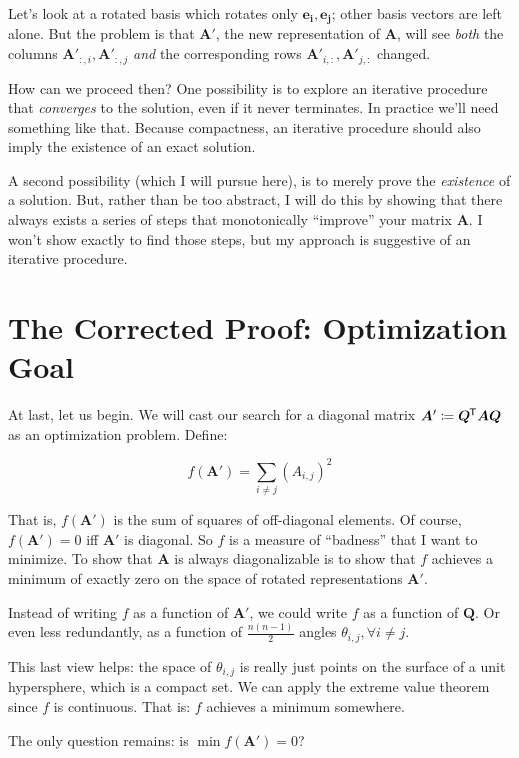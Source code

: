 \documentclass[11pt, oneside]{amsart}
\newcommand{\mtx}[1]{\bm{#1}}
\newcommand*{\tran}{^{\mkern-1.5mu\mathsf{T}}}
\renewcommand{\vec}[1]{\mathbf{#1}}
\newcommand{\bvec}[1]{\vec{e_{#1}}}
\newcommand{\mtxA}{\mtx{A}}
\newcommand{\mtxQ}{\mtx{Q}}
\begin{document}
Let's look at a rotated basis which rotates only $\bvec{i}, \bvec{j}$;
other basis vectors are left alone. But the problem is that $\mtxA'$,
the new representation of $\mtxA$, will see
\textit{both} the columns $\mtxA'_{:, i}, \mtxA'_{:, j}$ \textit{and}
the corresponding rows $\mtxA'_{i, :}, \mtxA'_{j, :}$ changed.

How can we proceed then? One possibility is to explore an iterative
procedure that \textit{converges} to the solution, even if it never
terminates. In practice we'll need something like that. Because
compactness, an iterative procedure should also imply the existence of
an exact solution.

A second possibility (which I will pursue here), is to merely prove the
\textit{existence} of a solution. But, rather than be too abstract, I
will do this by showing that there always exists a series of steps that
monotonically ``improve'' your matrix $\mtxA$. I won't show exactly to
find those steps, but my approach is suggestive of an iterative
procedure.

\section{The Corrected Proof: Optimization Goal}

At last, let us begin. We will cast our search for a diagonal matrix
$\mtxA' \coloneqq \mtxQ\tran \mtxA \mtxQ$ as an optimization problem.
Define:

\[
  f(\mtxA') = \sum_{i \ne j} \left(A_{i, j}\right)^2
\]

That is, $f(\mtxA')$ is the sum of squares of off-diagonal elements. Of
course, $f(\mtxA') = 0$ iff $\mtxA'$ is diagonal. So $f$ is a measure of
``badness'' that I want to minimize. To show that $\mtxA$ is always
diagonalizable is to show that $f$ achieves a minimum of exactly zero on
the space of rotated representations $\mtxA'$.

Instead of writing $f$ as a function of $\mtxA'$, we could write $f$ as
a function of $\mtxQ$. Or even less redundantly, as a function of
$\frac{n(n-1)}{2}$ angles $\theta_{i, j}, \forall i \ne j$.

This last view helps: the space of $\theta_{i, j}$ is really just points
on the surface of a unit hypersphere, which is a compact set. We can
apply the extreme value theorem since $f$ is continuous. That is: $f$
achieves a minimum somewhere.

The only question remains: is $\min f(\mtxA') = 0$?
\end{document}
